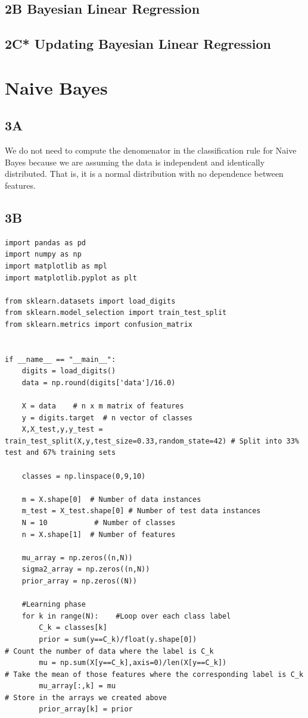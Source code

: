 \documentclass[12pt]{article}
\begin{document}
\begin{flushleft}
		\subsection*{2B Bayesian Linear Regression}
		
		\subsection*{2C* Updating Bayesian Linear Regression}
		
		\section*{Naive Bayes}
		
		\subsection*{3A}
		We do not need to compute the denomenator in the classification rule for Naive Bayes because we are assuming  the data is independent and identically distributed. That is, it is a normal distribution with no dependence between features.
		
		\subsection*{3B}
\begin{lstlisting}
import pandas as pd
import numpy as np
import matplotlib as mpl
import matplotlib.pyplot as plt

from sklearn.datasets import load_digits
from sklearn.model_selection import train_test_split
from sklearn.metrics import confusion_matrix


if __name__ == "__main__":
	digits = load_digits()
	data = np.round(digits['data']/16.0)
	
	X = data    # n x m matrix of features 
	y = digits.target  # n vector of classes
	X,X_test,y,y_test = train_test_split(X,y,test_size=0.33,random_state=42) # Split into 33% test and 67% training sets 
	
	classes = np.linspace(0,9,10) 
	
	m = X.shape[0]  # Number of data instances
	m_test = X_test.shape[0] # Number of test data instances
	N = 10           # Number of classes
	n = X.shape[1]  # Number of features
	
	mu_array = np.zeros((n,N))
	sigma2_array = np.zeros((n,N))
	prior_array = np.zeros((N))
	
	#Learning phase
	for k in range(N):    #Loop over each class label
		C_k = classes[k]
		prior = sum(y==C_k)/float(y.shape[0])                           # Count the number of data where the label is C_k
		mu = np.sum(X[y==C_k],axis=0)/len(X[y==C_k])                    # Take the mean of those features where the corresponding label is C_k
		mu_array[:,k] = mu                                              # Store in the arrays we created above
		prior_array[k] = prior
	

\end{lstlisting}
\end{flushleft}
\end{document}

